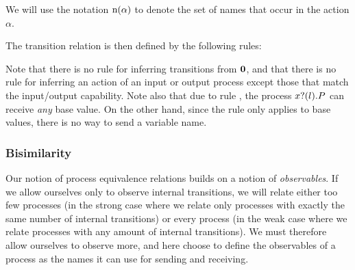 We will use the notation \( \textrm{n}(\alpha) \) to denote the set of names that occur in the action \( \alpha \).

The transition relation is then defined by the following rules:
Note that there is no rule for inferring transitions from \( \bm{0} \), and that there is no rule for inferring an action of an input or output process except those that match the input/output capability.
Note also that due to rule , the process \( x ? (l) . P \) can receive \emph{any} base value.
On the other hand, since the rule  only applies to base values, there is no way to send a variable name.


\subsubsection{Bisimilarity}
Our notion of process equivalence relations builds on a notion of \emph{observables}.
If we allow ourselves only to observe internal transitions, we will relate either too few processes (in the strong case where we relate only processes with exactly the same number of internal transitions) or every process (in the weak case where we relate processes with any amount of internal transitions).
We must therefore allow ourselves to observe more, and here choose to define the observables of a process as the names it can use for sending and receiving.

